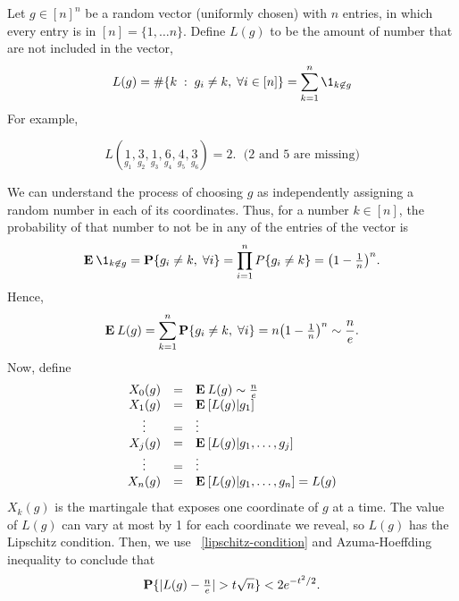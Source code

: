 Let $g \in {[n]}^{n}$ be a random vector (uniformly chosen) with $n$ entries, in which every entry is in $[n] = \{1,\ldots n\}$. Define $L(g)$ to be the amount of number that are not included in the vector,
\[ L(g) = \# \{ k \;:\; g_i \neq k,\; \forall i \in [n]\} = \sum_{k = 1}^{n} \1_{k \not\in g} \] 
For example,

\[ L(\underset{g_1}{1},\underset{g_2}{3},\underset{g_3}{1},\underset{g_4}{6},\underset{g_5}{4},\underset{g_6}{3}) = 2.\;\text{ (2 and 5 are missing)} \]

We can understand the process of choosing $g$ as independently assigning a random number in each of its coordinates. Thus, for a number $k \in [n]$, the probability of that number to not be in any of the entries of the vector is
\[\E \1_{k \not\in g} = \P\{g_i \neq k, \; \forall i\} = \prod_{i = 1}^n P\{g_i \neq k\} = {\left(1-\tfrac{1}{n}\right)}^n. \] 
Hence,
\[ \E L(g) = \sum_{k = 1}^n \P\{g_i \neq k, \; \forall i\} = n {\left(1-\tfrac{1}{n}\right)}^n \sim \frac{n}{e}. \] 
Now, define
\[\begin{array}{rcl}
    X_0(g) & = & \E L(g) \sim \frac{n}{e}\\
    X_1(g) & = & \E [ L(g) | g_1 ] \\
    \hfill\vdots\hfill & = & \vdots \\
    X_j(g) & = & \E [L(g) | g_1, \ldots, g_j ]\\
    \hfill\vdots\hfill & = & \vdots \\
    X_n(g) & = & \E [L(g) | g_1, \ldots, g_n] = L(g)
\end{array} \] 
$X_k(g)$ is the martingale that exposes one coordinate of $g$ at a time. The value of $L(g)$ can vary at most by 1 for each coordinate we reveal, so $L(g)$ has the Lipschitz condition. Then, we use ~\ref{lipschitz-condition} and Azuma-Hoeffding inequality to conclude that
\[ \P\{|L(g) - \tfrac{n}{e}| > t\sqrt{n}\} < 2e^{-t^2 / 2}. \] 



\vspace*{3em}
